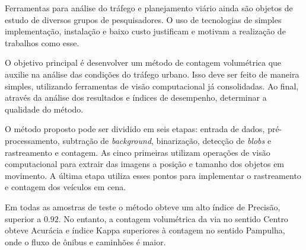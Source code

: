 


Ferramentas para análise do tráfego e planejamento viário ainda são objetos de estudo de diversos grupos de pesquisadores. O uso de tecnologias de simples implementação, instalação e baixo custo justificam e motivam a realização de trabalhos como esse.

O objetivo principal é desenvolver um método de contagem volumétrica que auxilie na análise das condições do tráfego urbano. Isso deve ser feito de maneira simples, utilizando ferramentas de visão computacional já consolidadas. Ao final, através da análise dos resultados e índices de desempenho, determinar a qualidade do método.

O método proposto pode ser dividido em seis etapas: entrada de dados, pré-processamento, subtração de \textit{background}, binarização, detecção de \textit{blobs} e rastreamento e contagem. As cinco primeiras utilizam operações de visão computacional para extrair das imagens a posição e tamanho dos objetos em movimento. A última etapa utiliza esses pontos para implementar o rastreamento e contagem dos veículos em cena.

Em todas as amostras de teste o método obteve um alto índice de Precisão, superior a $0.92$. No entanto, a contagem volumétrica da via no sentido Centro obteve Acurácia e índice Kappa superiores à contagem no sentido Pampulha, onde o fluxo de ônibus e caminhões é maior.


